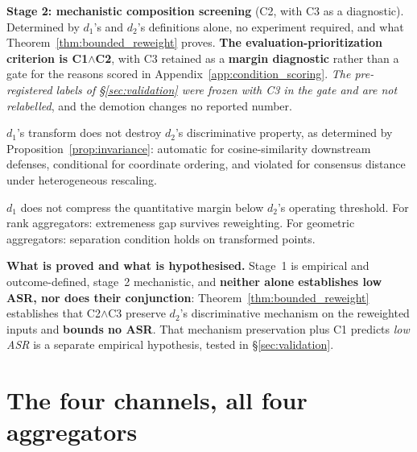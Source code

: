 \documentclass{article}
\begin{document}
\smallskip
\noindent\textbf{Stage 2: mechanistic composition screening} (C2, with C3 as a diagnostic). Determined by $d_1$'s and $d_2$'s definitions alone, no experiment required, and what Theorem~\ref{thm:bounded_reweight} proves. \textbf{The evaluation-prioritization criterion is C1$\wedge$C2}, with C3 retained as a \textbf{margin diagnostic} rather than a gate for the reasons scored in Appendix~\ref{app:condition_scoring}. \emph{The pre-registered labels of \S\ref{sec:validation} were frozen with C3 in the gate and are not relabelled}, and the demotion changes no reported number.
\begin{description}[topsep=2pt,parsep=0pt,itemsep=3pt,leftmargin=0pt,labelindent=0pt,itemindent=\labelsep]
\item[(C2) Discriminative-property preservation.] $d_1$'s transform does not destroy $d_2$'s discriminative property, as determined by Proposition~\ref{prop:invariance}: automatic for cosine-similarity downstream defenses, conditional for coordinate ordering, and violated for consensus distance under heterogeneous rescaling.
\item[(C3) Margin preservation.] $d_1$ does not compress the quantitative margin below $d_2$'s operating threshold. For rank aggregators: extremeness gap survives reweighting. For geometric aggregators: separation condition holds on transformed points.
\end{description}
\textbf{What is proved and what is hypothesised.} Stage~1 is empirical and outcome-defined, stage~2 mechanistic, and \textbf{neither alone establishes low ASR, nor does their conjunction}: Theorem~\ref{thm:bounded_reweight} establishes that C2$\wedge$C3 preserve $d_2$'s discriminative mechanism on the reweighted inputs and \textbf{bounds no ASR}. That mechanism preservation plus C1 predicts \emph{low ASR} is a separate empirical hypothesis, tested in \S\ref{sec:validation}.

\section{The four channels, all four aggregators}
\label{app:channel_table}
\end{document}
